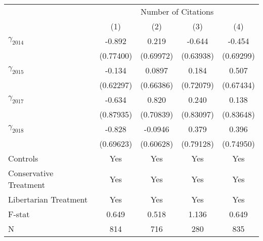 \def\sym#1{\ifmmode^{#1}\else\(^{#1}\)\fi}
\setlength\tabcolsep{17pt}
\begin{tabular}{@{\extracolsep{7pt}}lcccc}
\toprule
                    &\multicolumn{4}{c}{Number of Citations}                                                \\\cmidrule(lr){2-5}
                    &\multicolumn{1}{c}{(1)}         &\multicolumn{1}{c}{(2)}         &\multicolumn{1}{c}{(3)}         &\multicolumn{1}{c}{(4)}         \\
\midrule
\large $\gamma_{2014}$&      -0.892         &       0.219         &      -0.644         &      -0.454         \\
                    &   (0.77400)         &   (0.69972)         &   (0.63938)         &   (0.69299)         \\
\addlinespace
\large $\gamma_{2015}$&      -0.134         &      0.0897         &       0.184         &       0.507         \\
                    &   (0.62297)         &   (0.66386)         &   (0.72079)         &   (0.67434)         \\
\addlinespace
\large $\gamma_{2017}$&      -0.634         &       0.820         &       0.240         &       0.138         \\
                    &   (0.87935)         &   (0.70839)         &   (0.83097)         &   (0.83648)         \\
\addlinespace
\large $\gamma_{2018}$&      -0.828         &     -0.0946         &       0.379         &       0.396         \\
                    &   (0.69623)         &   (0.60628)         &   (0.79128)         &   (0.74950)         \\
\midrule
Controls            &         Yes         &         Yes         &         Yes         &         Yes         \\
Conservative Treatment&         Yes         &         Yes         &         Yes         &         Yes         \\
Libertarian Treatment&         Yes         &         Yes         &         Yes         &         Yes         \\
F-stat              &       0.649         &       0.518         &       1.136         &       0.649         \\
N                   &         814         &         716         &         280         &         835         \\
\bottomrule
\end{tabular}
